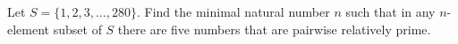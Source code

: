 Let $S = \{1, 2, 3, \ldots, 280\}$. Find the minimal natural number $n$ such that in any $n$-element subset of $S$ there are five numbers that are pairwise relatively prime.
